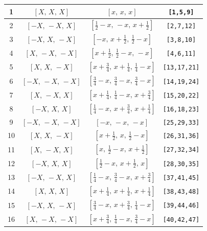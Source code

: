 \documentclass[fleqn,8pt]{jsarticle}
\begin{document}
\begin{longtable}{cccc}
1 & $\left[ X,\, X,\, X \right]$ & $\left[ x,\, x,\, x \right]$ & {\tt [1,5,9]} \\ \hline
2 & $\left[ - X,\, - X,\, X \right]$ & $\left[ \frac{1}{2} - x,\, - x,\, x + \frac{1}{2} \right]$ & {\tt [2,7,12]} \\ \hline
3 & $\left[ - X,\, X,\, - X \right]$ & $\left[ - x,\, x + \frac{1}{2},\, \frac{1}{2} - x \right]$ & {\tt [3,8,10]} \\ \hline
4 & $\left[ X,\, - X,\, - X \right]$ & $\left[ x + \frac{1}{2},\, \frac{1}{2} - x,\, - x \right]$ & {\tt [4,6,11]} \\ \hline
5 & $\left[ X,\, X,\, - X \right]$ & $\left[ x + \frac{3}{4},\, x + \frac{1}{4},\, \frac{1}{4} - x \right]$ & {\tt [13,17,21]} \\ \hline
6 & $\left[ - X,\, - X,\, - X \right]$ & $\left[ \frac{3}{4} - x,\, \frac{3}{4} - x,\, \frac{3}{4} - x \right]$ & {\tt [14,19,24]} \\ \hline
7 & $\left[ X,\, - X,\, X \right]$ & $\left[ x + \frac{1}{4},\, \frac{1}{4} - x,\, x + \frac{3}{4} \right]$ & {\tt [15,20,22]} \\ \hline
8 & $\left[ - X,\, X,\, X \right]$ & $\left[ \frac{1}{4} - x,\, x + \frac{3}{4},\, x + \frac{1}{4} \right]$ & {\tt [16,18,23]} \\ \hline
9 & $\left[ - X,\, - X,\, - X \right]$ & $\left[ - x,\, - x,\, - x \right]$ & {\tt [25,29,33]} \\ \hline
10 & $\left[ X,\, X,\, - X \right]$ & $\left[ x + \frac{1}{2},\, x,\, \frac{1}{2} - x \right]$ & {\tt [26,31,36]} \\ \hline
11 & $\left[ X,\, - X,\, X \right]$ & $\left[ x,\, \frac{1}{2} - x,\, x + \frac{1}{2} \right]$ & {\tt [27,32,34]} \\ \hline
12 & $\left[ - X,\, X,\, X \right]$ & $\left[ \frac{1}{2} - x,\, x + \frac{1}{2},\, x \right]$ & {\tt [28,30,35]} \\ \hline
13 & $\left[ - X,\, - X,\, X \right]$ & $\left[ \frac{1}{4} - x,\, \frac{3}{4} - x,\, x + \frac{3}{4} \right]$ & {\tt [37,41,45]} \\ \hline
14 & $\left[ X,\, X,\, X \right]$ & $\left[ x + \frac{1}{4},\, x + \frac{1}{4},\, x + \frac{1}{4} \right]$ & {\tt [38,43,48]} \\ \hline
15 & $\left[ - X,\, X,\, - X \right]$ & $\left[ \frac{3}{4} - x,\, x + \frac{3}{4},\, \frac{1}{4} - x \right]$ & {\tt [39,44,46]} \\ \hline
16 & $\left[ X,\, - X,\, - X \right]$ & $\left[ x + \frac{3}{4},\, \frac{1}{4} - x,\, \frac{3}{4} - x \right]$ & {\tt [40,42,47]} \\
\end{longtable}
\end{document}
